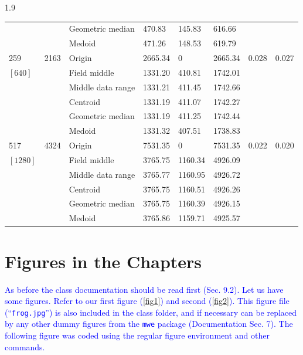 \documentclass[phd]{ndsu-thesis-2022}
\newcommand\myspacing{1.9}      %
\newcommand\italk[1]{\textcolor{blue}{#1}}  %
\begin{document}
\begin{spacing}{\myspacing}
{{\begin{ThreePartTable}
\begin{longtable}{lll lll ll}
 &  & Geometric median & 470.83 & 145.83 & 616.66 \\
 &  & Medoid  & 471.26 & 148.53 & 619.79 \\
\midrule
259 & 2163 & Origin  & 2665.34 & 0 & 2665.34 & 0.028 & 0.027 \\
$[640]$ &  & Field middle  & 1331.20 & 410.81 & 1742.01 \\
 &  & Middle data range  & 1331.21 & 411.45 & 1742.66 \\
 &  & Centroid & 1331.19 & 411.07 & 1742.27 \\
 &  & Geometric median & 1331.19 & 411.25 & 1742.44 \\
 &  & Medoid  & 1331.32 & 407.51 & 1738.83 \\
\midrule
517 & 4324 & Origin  & 7531.35 & 0 & 7531.35 & 0.022 & 0.020 \\
$[1280]$ &  & Field middle  & 3765.75 & 1160.34 & 4926.09 \\
 &  & Middle data range  & 3765.77 & 1160.95 & 4926.72 \\
 &  & Centroid & 3765.75 & 1160.51 & 4926.26 \\
 &  & Geometric median & 3765.75 & 1160.39 & 4926.15 \\
 &  & Medoid  & 3765.86 & 1159.71 & 4925.57 \\
  \end{longtable} 
\end{ThreePartTable}
}
}
\setlength{\parindent}{0.5in}
\vspace{-2ex}

\kant[3]



\section{Figures in the Chapters}
\italk{As before the class documentation should be read first (Sec. 9.2). Let us have some figures. Refer to our first figure (\cref{fig1}) and second (\cref{fig2}). This figure file (``\texttt{frog.jpg}'') is also included in the class folder, and if necessary can be replaced by any other dummy figures from the \texttt{mwe} package (Documentation Sec. 7). The following figure was coded using the regular figure environment and other commands.}


\end{spacing}
\end{document}
